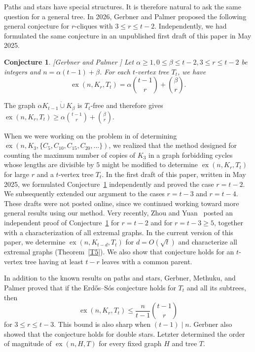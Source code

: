 \documentclass[11pt,a4paper]{article}
\newtheorem{conjecture}[theorem]{Conjecture}
\newcommand{\ex}{\operatorname{ex}}
\newcommand{\dunion}{\mathbin{\dot\cup}}
\begin{document}
 Paths and stars have special structures. It is therefore natural to ask the same question for a general tree. In 2026, Gerbner and Palmer \cite{GP2026} proposed the following general conjecture for $r$-cliques with $3\leq r\leq t-2$. Independently, we had formulated the same conjecture in an unpublished first draft of this paper in May 2025.



\begin{conjecture}\label{C1}[Gerbner and Palmer \cite{GP2026}]
Let $\alpha\geq 1, 0\leq \beta\leq t-2, 3\leq r\leq t-2$ be integers and $n=\alpha (t-1)+\beta$.
    For each $t$-vertex tree $T_{t}$, we have
\[
\ex(n,K_r,T_t)=\alpha\binom{t-1}{r}+\binom{\beta}{r}.
\]
\end{conjecture}

The graph \(\alpha K_{t-1}\dunion K_\beta\) is \(T_t\)-free and therefore gives $\ex(n,K_r,T_t)\ge \alpha\binom{t-1}{r}+\binom{\beta}{r}$.


When we were working on the problem in \cite{ZP1} of determining $\ex(n,K_3,\{C_5,C_{10},C_{15},C_{20},\ldots\})$, we realized that the method designed for counting the maximum number of copies of $K_3$ in a graph forbidding cycles whose lengths are divisible by $5$ might be modified to determine $\ex(n,K_r,T_t)$ for large $r$ and a $t$-vertex tree $T_t$. In the first draft of this paper, written in May 2025, we formulated Conjecture~\ref{C1} independently and proved the case $r=t-2$. We subsequently extended our argument to the cases $r=t-3$ and $r=t-4$. These drafts were not posted online, since we continued working toward more general results using our method. Very recently, Zhou and Yuan~\cite{ZhouYuan2026} posted an independent proof of Conjecture~\ref{C1} for $r=t-2$ and for $r=t-3\ge5$, together with a characterization of all extremal graphs.  In the current version of this paper, we determine $\ex(n,K_{t-d},T_t)$ for $d=O(\sqrt{t})$ and characterize all extremal graphs (Theorem~\ref{T5}). We also show that conjecture holds for an $t$-vertex tree having at least $t-r$ leaves with a common parent.

In addition to the known results on paths and stars, Gerbner, Methuku, and Palmer \cite{GMP2020} proved that if the Erd\H{o}s--S\'{o}s conjecture holds for \(T_t\) and all its subtrees, then
\[
\ex(n,K_r,T_t)\le \frac{n}{t-1}\binom{t-1}{r}
\]
for \(3\le r\le t-3\). This bound is also sharp when \((t-1)\mid n\). Gerbner \cite{gerbner2023doublestars} also showed that the conjecture holds for double stars. Letzter \cite{letzter2019} determined the order of magnitude of \(\ex(n,H,T)\) for every fixed graph \(H\) and tree \(T\).
\end{document}
